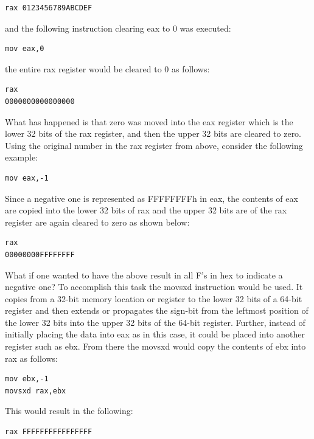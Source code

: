 \documentclass[10pt]{book}
\begin{document}
\begin{verbatim}
rax 0123456789ABCDEF
\end{verbatim}

and the following instruction clearing eax to 0 was executed:

\begin{verbatim}
mov eax,0
\end{verbatim}

the entire rax register would be cleared to 0 as follows:

\begin{verbatim}
rax
0000000000000000
\end{verbatim}

What has happened is that zero was moved into the eax register which is the lower 32 bits of the rax register, and then the upper 32 bits are cleared to zero. Using the original number in the rax register from above, consider the following example:

\begin{verbatim}
mov eax,-1
\end{verbatim}

Since a negative one is represented as FFFFFFFFh in eax, the contents of eax are copied into the lower 32 bits of rax and the upper 32 bits are of the rax register are again cleared to zero as shown below:

\begin{verbatim}
rax
00000000FFFFFFFF
\end{verbatim}

What if one wanted to have the above result in all F's in hex to indicate a negative one? To accomplish this task the movsxd instruction would be used. It copies from a 32-bit memory location or register to the lower 32 bits of a 64-bit register and then extends or propagates the sign-bit from the leftmost position of the lower 32 bits into the upper 32 bits of the 64-bit register. Further, instead of initially placing the data into eax as in this case, it could be placed into another register such as ebx. From there the movsxd would copy the contents of ebx into rax as follows:

\begin{verbatim}
mov ebx,-1
movsxd rax,ebx
\end{verbatim}

This would result in the following:

\begin{verbatim}
rax FFFFFFFFFFFFFFFF
\end{verbatim}
\end{document}
